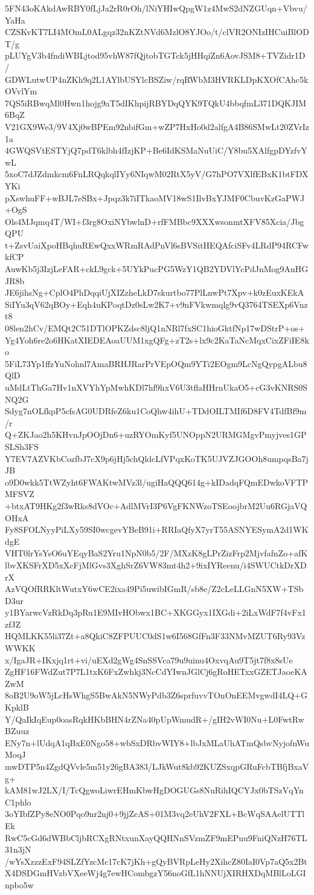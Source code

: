 5FN43oKAkdAwRBY0fLjJa2rR0rOh/lNiYHIwQpgW1z4MwS2dNZGUqn+Vbvu/YaHa
CZSKvKT7LI4MOmL0ALgqz32nKZtNVd6MzlO8YJOo/t/clVR2ONIzIHCuiBlODT/g
pLUYgV3b4fndiWBLjtod95vhW87fQjtobTGTck5jHHqiZn6AovJSM8+TVZidr1D/
GDWLutwUP4nZKh9q2L1AYlbUSYlcBSZiw/rqRWbM3HVRKLDpKXOfCAhc5kOVvlYm
7QS5iRBwqMl0Hwn1hojg9aT5dIKhpijRBYDqQYK9TQkU4bbqfmL371DQKJIM6BqZ
V21GX9We3/9V4Xj0wBPEm92nbifGm+wZP7HxHo0d2alfgA4B86SMwLt20ZVrIz1a
4GWQSVtESTYjQ7pdT6klbh4fIzjKP+Be6IdKSMaNuUiC/Y8bu5XAlfgpDYzfvYwL
5xoC7dJZdmkcm6FnLRQqkqlIYy6NIqwM02RtX5yV/G7hPO7VXlfEBxK1btFDXYKi
pXswhuFF+wBJL7eSBx+Jpqz3k7iITkaoMV18wS1IlvBxYJMF0CbuvKzGaPWJ+OgS
Ols4MJqmq4T/WI+f3rg8OxiNYbwlnD+rfFMBbc9XXXwsonmtXFV85Xcia/JbgQPU
t+ZsvUaiXpoHBqhuREwQxxWRmRAdPnVl6sBVSitHEQAfciSFv4LRdP94RCFwkfCP
AuwKb5j3IzjLeFAR+ckL9gck+5UYkPucPG5WzY1QB2YDVlYcPdJnMog9AnHGJR8b
JE6jihsNg+CplO4PhDqqiUjXIZzheLkD7skurtbo77PlLnwPt7Xpv+k0zEuxKEkA
SiIYu3qV62qBOy+Eqh4uKPoqtDz0sLw2K7+v9nFVkwmqlg9vQ3764TSEXp6Vnzt8
08len2hCv/EMQt2C51DTlOPKZdsc8ljQ1nNRl7fxSC1hioGktfNp17wDStrP+os+
Yg4Yoh6re2o6HKatXIEDEAoaUUM1xgQFg+zT2s+lx9c2KaTaNcMqxCixZFiIE8ko
5FiL73Yp1ffzYuNohnl7AmaBRHJRarPrVEpOQm9YTi2EOgm9LcNgQypgALbu8QlD
uMdLtThGa7Hv1nXVYhYpMwhKDl7hf9hxV6U3tflaHHrnUkaO5+cG3vKNRS0SNQ2G
Sdyg7nOLfkpP5cfsAG0UDRfeZ6ku1CoQhw4ihU+TDdOILTMIf6D8FV4TdfBf9m/r
Q+ZKJao2h5KHvnJpOOjDn6+uzRYOmKyf5UNOppN2URMGMgvPmyjves1GPSLSh3FS
Y7EV7AZVKbCozfbJ7cX9p6jHj5chQldcLfVPqxKoTK5UJVZJGOOh8umpqsBa7jJB
o9D0wkk5TtWZyht6FWAKtwMVz3l/ugiHaQQQ614g+kIDadqFQmEDwkoVFTPMFSVZ
+btxAT9HKg2f3wRks8dVOc+AdlMVrI3P6VgFKNWzoTSEoojbrM2Uu6RGjaVQOHxA
Fy8SFOLNyyPiLXy59SI0wcgevYBeB91i+RRIaQfyX7yrT55ASNYESymA2d1WKdgE
VHT0lrYsYsO6uYEqyBaS2Yru1NpN0b5/2F/MXzK8gLPrZizFrp2MjvfafnZo+afK
lbvXKSFrXD5xXcFjMlGvs3XghSrZ6VW83mt4h2+9ixIYReenu/i4SWUCtkDrXDrX
AzVQOfRRKltWutxY6wCE2ixa49Pi5uwibIGmR/sb8e/Z2cLeLLGnN5XW+TSbD3ur
y1BYarwcVzRkDq3pRu1E9MIvHObwx1BC+XKGGyx1IXGdi+2iLxWdF7f4vFx1zfJZ
HQMLKK55li37Zt+a8QkiC8ZFPUUC0dS1w6I568GfFn3F33NMvMZUT6Ry93VzWWKK
x/IgaJR+IKxjq1rt+vi/uEXd2gWg4SnSSVca79u9uinu4OxvqAu9T5jt7f8x8sUe
ZgHF16FWdZut7P7L1txK6FxZwhkj3NcCdYIwnJGlCj6gRoHETxxGZETJaoeKAZwM
8oB2U9oW5jLcHsWhgS5BwAkN5NWyPdb3Z6sprfuvvTOnOnEEMvgwdI4LQ+GKpklB
Y/QaIkIqEup0oasRqkHKbBHN4rZNa40pUpWmudR+/gIH2vWI0Nu+L0FwtRwBZuuz
ENy7n+lUdqA1qBxE0Ngo58+wbSxDRbvWIY8+lbJxMLaUhATmQsbvNyjofnWuMoqJ
mwDTP5n4ZgdQVvle5m51y26gBA383/LJkWut8kb92KUZSxqpGRuFcbTBfjBxaVg+
kAM81wJ2LX/I/TcQgwoLiwrEHmKbwHgDOGUGs8NuRihIQCYJx0bTSzVqYnC1phlo
3oYIbfZPy8eNO0Pqo9nr2nj0+9jjZcAS+01M3vq2eUhV2FXL+BcWqSAAelUTTlEk
RwC5cGd6dWBbCljbRCXgRNtxunXayQQHNnSVzmZF9mEPuu9FniQNzH76TL31n3jN
/wYsXzzzExF94SLZfYzcMc17cK7jKh+gQyBVRpLeHy2XihcZ80IaI0Vp7aQ5x2Bt
X4DSDGmHVzbVXeeWj4g7ewHCombgzY56noGfL1hNNUjXIRHXDqMBlLoLGInpbo5w
